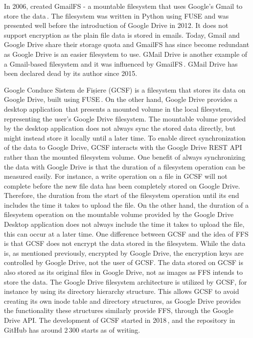In 2006, \citeauthor{jonesGoogleHackUse2006} created GmailFS - a mountable filesystem that uses Google's Gmail to store the data\,\cite{jonesGoogleHackUse2006, jonesGmailFilesystemImplementation2006}. The filesystem was written in Python using FUSE and was presented well before the introduction of Google Drive in 2012. It does not support encryption as the plain file data is stored in emails. Today, Gmail and Google Drive share their storage quota and GmailFS has since become redundant as Google Drive is an easier filesystem to use. GMail Drive is another example of a Gmail-based filesystem and it was influenced by GmailFS\,\cite{viksoeViksoeDkGMail2004}. GMail Drive has been declared dead by its author since 2015.

Google Conduce Sistem de Fișiere (\gls{GCSF}) is a filesystem that stores its data on Google Drive, built using FUSE\,\cite{puscassergiudanGCSFVIRTUALFILE2018,puscasHarababurelGcsf2022}. On the other hand, Google Drive provides a desktop application\,\cite{googleInstallSetGoogle} that presents a mounted volume in the local filesystem, representing the user's Google Drive filesystem. The mountable volume provided by the desktop application does not always sync the stored data directly, but might instead store it locally until a later time. To enable direct synchronization of the data to Google Drive, GCSF interacts with the Google Drive REST API rather than the mounted filesystem volume. One benefit of always synchronizing the data with Google Drive is that the duration of a filesystem operation can be measured easily. For instance, a write operation on a file in GCSF will not complete before the new file data has been completely stored on Google Drive. Therefore, the duration from the start of the filesystem operation until its end includes the time it takes to upload the file. On the other hand, the duration of a filesystem operation on the mountable volume provided by the Google Drive Desktop application does not always include the time it takes to upload the file, this can occur at a later time. One difference between GCSF and the idea of FFS is that GCSF does not encrypt the data stored in the filesystem. While the data is, as mentioned previously, encrypted by Google Drive, the encryption keys are controlled by Google Drive, not the user of GCSF. The data stored on GCSF is also stored as its original files in Google Drive, not as images as FFS intends to store the data. The Google Drive filesystem architecture is utilized by GCSF, for instance by using its directory hierarchy structure. This allows GCSF to avoid creating its own inode table and directory structures, as Google Drive provides the functionality these structures similarly provide FFS, through the Google Drive API. The development of GCSF started in 2018\,\cite{puscasHarababurelGcsf2022}, and the repository in GitHub has around $2\,300$ starts as of writing. 

